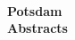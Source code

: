\documentclass[%
  b5paper,
  pagesize,%
  1headlines,%
  8pt,%
  DIV=18,
  BCOR=12mm,
  twoside,
  smallheadings,
]{scrartcl}
\begin{document}
\sloppy


\thispagestyle{empty}
\begin{center}
\unilogo\\
\Huge\bfseries Potsdam\\ Abstracts \\
\end{center}


\begin{multicols}{2}

\end{multicols}

\newpage
\renewcommand{\indexname}{Author Index}

\printindex
\end{document}
